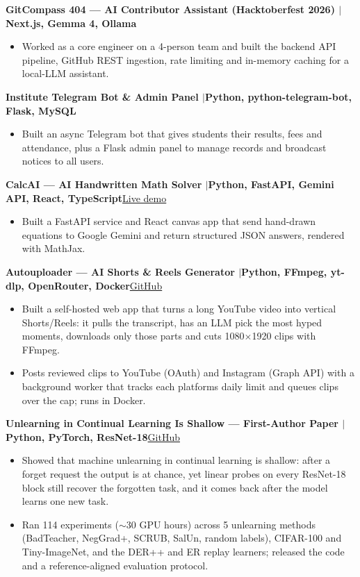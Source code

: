 \documentclass[10pt,a4paper]{article}
\newcommand{\entry}[2]{\par\textbf{#1}\hfill #2\par}
\newenvironment{points}{\vspace{-4pt}\begin{itemize}\setlength{\itemsep}{0pt}\setlength{\parskip}{0pt}\setlength{\topsep}{0pt}\setlength{\partopsep}{0pt}\setlength{\leftmargin}{12pt}}{\end{itemize}\vspace{-2pt}}
\newcommand{\sep}{\enspace$|$\enspace}
\begin{document}
\entry{GitCompass 404 --- AI Contributor Assistant (Hacktoberfest 2026) \textnormal{\sep Next.js, Gemma 4, Ollama}}{}
\begin{points}
  \item Worked as a core engineer on a 4-person team and built the backend API pipeline, GitHub REST ingestion, rate limiting and in-memory caching for a local-LLM assistant.
\end{points}
\entry{Institute Telegram Bot \& Admin Panel \textnormal{\sep Python, python-telegram-bot, Flask, MySQL}}{}
\begin{points}
  \item Built an async Telegram bot that gives students their results, fees and attendance, plus a Flask admin panel to manage records and broadcast notices to all users.
\end{points}
\entry{CalcAI --- AI Handwritten Math Solver \textnormal{\sep Python, FastAPI, Gemini API, React, TypeScript}}{\href{https://calcai-50046872763.development.catalystappsail.in}{Live demo}}
\begin{points}
  \item Built a FastAPI service and React canvas app that send hand-drawn equations to Google Gemini and return structured JSON answers, rendered with MathJax.
\end{points}

\entry{Autouploader --- AI Shorts \& Reels Generator \textnormal{\sep Python, FFmpeg, yt-dlp, OpenRouter, Docker}}{\href{https://github.com/Adarshmilan/autouploader}{GitHub}}
\begin{points}
  \item Built a self-hosted web app that turns a long YouTube video into vertical Shorts/Reels: it pulls the transcript, has an LLM pick the most hyped moments, downloads only those parts and cuts 1080$\times$1920 clips with FFmpeg.
  \item Posts reviewed clips to YouTube (OAuth) and Instagram (Graph API) with a background worker that tracks each platforms daily limit and queues clips over the cap; runs in Docker.
\end{points}
\entry{Unlearning in Continual Learning Is Shallow --- First-Author Paper \textnormal{\sep Python, PyTorch, ResNet-18}}{\href{https://github.com/Adarshmilan/CUL-continual-unlearning-}{GitHub}}
\begin{points}
  \item Showed that machine unlearning in continual learning is shallow: after a forget request the output is at chance, yet linear probes on every ResNet-18 block still recover the forgotten task, and it comes back after the model learns one new task.
  \item Ran 114 experiments ($\sim$30 GPU hours) across 5 unlearning methods (BadTeacher, NegGrad+, SCRUB, SalUn, random labels), CIFAR-100 and Tiny-ImageNet, and the DER++ and ER replay learners; released the code and a reference-aligned evaluation protocol.
\end{points}
\end{document}
